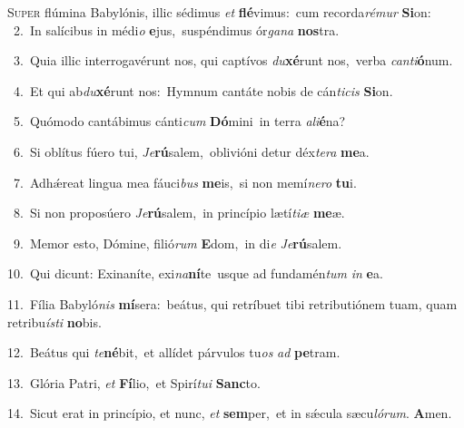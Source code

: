 \lettrine{\initial\textcolor{\initialcolor}{S}}{uper} flúmina Babylónis, illic sédimus \textit{et} \textbf{flé}\-vimus:~\star cum recorda\-\textit{ré}\-\textit{mur} \textbf{Si}\-on:\\
{\numbfont\textcolor{\numbcolor}{~2.}}~In salícibus in médi\textit{o} \textbf{e}\-jus,~\star suspéndimus ór\-\textit{ga}\-\textit{na} \textbf{nos}\-tra.\par
{\numbfont\textcolor{\numbcolor}{~3.}}~Quia illic interrogavérunt nos, qui captívos \textit{du}\-\textbf{xé}runt nos,~\star verba \textit{can}\-\textit{ti}\textbf{ó}num.\par
{\numbfont\textcolor{\numbcolor}{~4.}}~Et qui ab\-\textit{du}\-\textbf{xé}runt nos:~\star Hymnum cantáte nobis de cán\-\textit{ti}\-\textit{cis} \textbf{Si}\-on.\par
{\numbfont\textcolor{\numbcolor}{~5.}}~Quómodo cantábimus cánti\textit{cum} \textbf{Dó}\-mini~\star in terra \textit{a}\-\textit{li}\textbf{é}na?\par
{\numbfont\textcolor{\numbcolor}{~6.}}~Si oblítus fúero tui, \textit{Je}\-\textbf{rú}salem,~\star oblivióni detur déx\-\textit{te}\-\textit{ra} \textbf{me}\-a.\par
{\numbfont\textcolor{\numbcolor}{~7.}}~Adhǽreat lingua mea fáuci\textit{bus} \textbf{me}\-is,~\star si non memí\-\textit{ne}\-\textit{ro} \textbf{tu}\-i.\par
{\numbfont\textcolor{\numbcolor}{~8.}}~Si non proposúero \textit{Je}\-\textbf{rú}salem,~\star in princípio lætí\-\textit{ti}\-\textit{æ} \textbf{me}\-æ.\par
{\numbfont\textcolor{\numbcolor}{~9.}}~Memor esto, Dómine, filió\textit{rum} \textbf{E}\-dom,~\star in di\textit{e} \textit{Je}\-\textbf{rú}salem.\par
{\numbfont\textcolor{\numbcolor}{10.}}~Qui dicunt: Exinaníte, exi\-\textit{na}\-\textbf{ní}te~\star usque ad fundamén\textit{tum} \textit{in} \textbf{e}\-a.\par
{\numbfont\textcolor{\numbcolor}{11.}}~Fília Babyló\textit{nis} \textbf{mí}\-sera:~\star beátus, qui retríbuet tibi retributiónem tuam, quam retribu\-\textit{ís}\-\textit{ti} \textbf{no}\-bis.\par
{\numbfont\textcolor{\numbcolor}{12.}}~Beátus qui \textit{te}\-\textbf{né}bit,~\star et allídet párvulos tu\textit{os} \textit{ad} \textbf{pe}\-tram.\par
{\numbfont\textcolor{\numbcolor}{13.}}~Glória Patri, \textit{et} \textbf{Fí}\-lio,~\star et Spirí\-\textit{tu}\-\textit{i} \textbf{Sanc}\-to.\par
{\numbfont\textcolor{\numbcolor}{14.}}~Sicut erat in princípio, et nunc, \textit{et} \textbf{sem}\-per,~\star et in sǽcula sæcu\-\textit{ló}\-\textit{rum}. \textbf{A}\-men.\par

